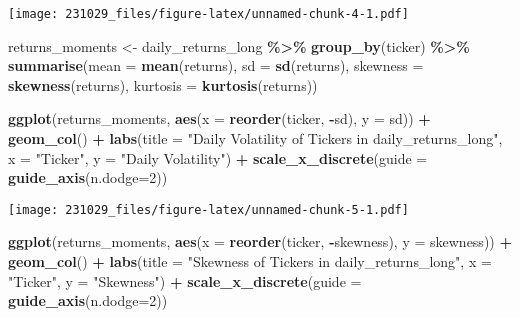 \documentclass[
]{article}
\newenvironment{Shaded}{\begin{snugshade}}{\end{snugshade}}
\newcommand{\AttributeTok}[1]{\textcolor[rgb]{0.13,0.29,0.53}{#1}}
\newcommand{\DecValTok}[1]{\textcolor[rgb]{0.00,0.00,0.81}{#1}}
\newcommand{\FunctionTok}[1]{\textcolor[rgb]{0.13,0.29,0.53}{\textbf{#1}}}
\newcommand{\NormalTok}[1]{#1}
\newcommand{\OtherTok}[1]{\textcolor[rgb]{0.56,0.35,0.01}{#1}}
\newcommand{\SpecialCharTok}[1]{\textcolor[rgb]{0.81,0.36,0.00}{\textbf{#1}}}
\newcommand{\StringTok}[1]{\textcolor[rgb]{0.31,0.60,0.02}{#1}}
\begin{document}
\texttt{[image: 231029\_files/figure-latex/unnamed-chunk-4-1.pdf]}

\begin{Shaded}
\begin{Highlighting}[]
\NormalTok{returns\_moments }\OtherTok{\textless{}{-}}\NormalTok{ daily\_returns\_long }\SpecialCharTok{\%\textgreater{}\%}
  \FunctionTok{group\_by}\NormalTok{(ticker) }\SpecialCharTok{\%\textgreater{}\%}
  \FunctionTok{summarise}\NormalTok{(}\AttributeTok{mean =} \FunctionTok{mean}\NormalTok{(returns),}
            \AttributeTok{sd =} \FunctionTok{sd}\NormalTok{(returns),}
            \AttributeTok{skewness =} \FunctionTok{skewness}\NormalTok{(returns),}
            \AttributeTok{kurtosis =} \FunctionTok{kurtosis}\NormalTok{(returns))}

\FunctionTok{ggplot}\NormalTok{(returns\_moments, }\FunctionTok{aes}\NormalTok{(}\AttributeTok{x =} \FunctionTok{reorder}\NormalTok{(ticker, }\SpecialCharTok{{-}}\NormalTok{sd), }\AttributeTok{y =}\NormalTok{ sd)) }\SpecialCharTok{+}
  \FunctionTok{geom\_col}\NormalTok{() }\SpecialCharTok{+}
  \FunctionTok{labs}\NormalTok{(}\AttributeTok{title =} \StringTok{"Daily Volatility of Tickers in daily\_returns\_long"}\NormalTok{, }\AttributeTok{x =} \StringTok{"Ticker"}\NormalTok{, }\AttributeTok{y =} \StringTok{"Daily Volatility"}\NormalTok{) }\SpecialCharTok{+}
  \FunctionTok{scale\_x\_discrete}\NormalTok{(}\AttributeTok{guide =} \FunctionTok{guide\_axis}\NormalTok{(}\AttributeTok{n.dodge=}\DecValTok{2}\NormalTok{))}
\end{Highlighting}
\end{Shaded}

\texttt{[image: 231029\_files/figure-latex/unnamed-chunk-5-1.pdf]}

\begin{Shaded}
\begin{Highlighting}[]
\FunctionTok{ggplot}\NormalTok{(returns\_moments, }\FunctionTok{aes}\NormalTok{(}\AttributeTok{x =} \FunctionTok{reorder}\NormalTok{(ticker, }\SpecialCharTok{{-}}\NormalTok{skewness), }\AttributeTok{y =}\NormalTok{ skewness)) }\SpecialCharTok{+}
  \FunctionTok{geom\_col}\NormalTok{() }\SpecialCharTok{+}
  \FunctionTok{labs}\NormalTok{(}\AttributeTok{title =} \StringTok{"Skewness of Tickers in daily\_returns\_long"}\NormalTok{, }\AttributeTok{x =} \StringTok{"Ticker"}\NormalTok{, }\AttributeTok{y =} \StringTok{"Skewness"}\NormalTok{) }\SpecialCharTok{+}
  \FunctionTok{scale\_x\_discrete}\NormalTok{(}\AttributeTok{guide =} \FunctionTok{guide\_axis}\NormalTok{(}\AttributeTok{n.dodge=}\DecValTok{2}\NormalTok{))}
\end{Highlighting}
\end{Shaded}
\end{document}
